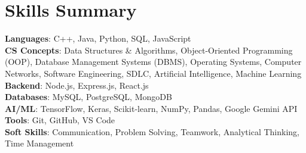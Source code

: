 \documentclass[letterpaper,11pt]{article}
\begin{document}
\section{Skills Summary}
 \begin{itemize}[leftmargin=0.15in, label={}]
    \small{\item{
     \textbf{Languages}{: C++, Java, Python, SQL, JavaScript} \\
     \textbf{CS Concepts}{: Data Structures \& Algorithms, Object-Oriented Programming (OOP), Database Management Systems (DBMS), Operating Systems, Computer Networks, Software Engineering, SDLC, Artificial Intelligence, Machine Learning} \\
     \textbf{Backend}{: Node.js, Express.js, React.js} \\
     \textbf{Databases}{: MySQL, PostgreSQL, MongoDB} \\
     \textbf{AI/ML}{: TensorFlow, Keras, Scikit-learn, NumPy, Pandas, Google Gemini API} \\
     \textbf{Tools}{: Git, GitHub, VS Code} \\
     \textbf{Soft Skills}{: Communication, Problem Solving, Teamwork, Analytical Thinking, Time Management}
    }}
 \end{itemize}

\end{document}
